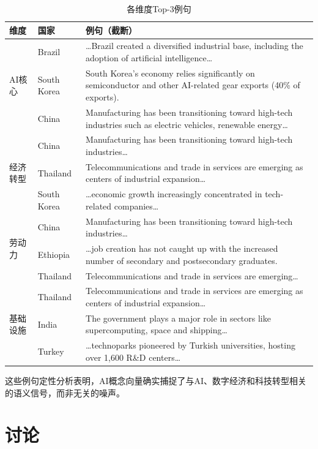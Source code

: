 \documentclass[11pt,a4paper]{article}
\begin{document}
\begin{table}[H]\centering\footnotesize
\caption{各维度Top-3例句}\label{tab:dim}
\begin{tabular}{lp{3.5cm}p{8.5cm}}
\toprule\textbf{维度} & \textbf{国家} & \textbf{例句（截断）} \\
\midrule
\multirow{3}{*}{AI核心}
& Brazil   & \dots Brazil created a diversified industrial base, including the adoption of artificial intelligence\dots \\
& South Korea & South Korea's economy relies significantly on semiconductor and other AI-related gear exports (40\% of exports). \\
& China    & Manufacturing has been transitioning toward high-tech industries such as electric vehicles, renewable energy\dots \\
\midrule
\multirow{3}{*}{经济转型}
& China    & Manufacturing has been transitioning toward high-tech industries\dots \\
& Thailand & Telecommunications and trade in services are emerging as centers of industrial expansion\dots \\
& South Korea & \dots economic growth increasingly concentrated in tech-related companies\dots \\
\midrule
\multirow{3}{*}{劳动力}
& China    & Manufacturing has been transitioning toward high-tech industries\dots \\
& Ethiopia & \dots job creation has not caught up with the increased number of secondary and postsecondary graduates. \\
& Thailand & Telecommunications and trade in services are emerging\dots \\
\midrule
\multirow{3}{*}{基础设施}
& Thailand & Telecommunications and trade in services are emerging as centers of industrial expansion\dots \\
& India    & The government plays a major role in sectors like supercomputing, space and shipping\dots \\
& Turkey   & \dots technoparks pioneered by Turkish universities, hosting over 1,600 R\&D centers\dots \\
\bottomrule
\end{tabular}
\end{table}

这些例句定性分析表明，AI概念向量确实捕捉了与AI、数字经济和科技转型相关的语义信号，而非无关的噪声。

\section{讨论}
\end{document}
